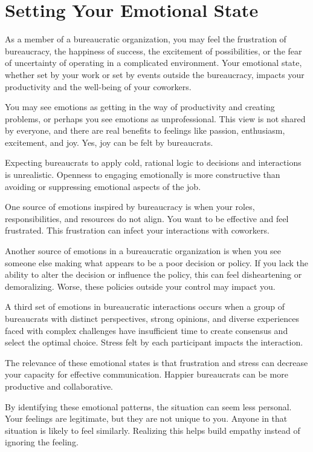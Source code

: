 \section{Setting Your Emotional State}

As a member of a bureaucratic organization, you may feel the frustration of bureaucracy, the happiness of success, the excitement of possibilities, or the fear of uncertainty of operating in a complicated environment. Your emotional state, whether set by your work or set by events outside the bureaucracy, impacts your productivity and the well-being of your coworkers. 

You may see emotions as getting in the way of productivity and creating problems, or perhaps you see emotions as unprofessional. This view is not shared by everyone, and there are real benefits to feelings like passion, enthusiasm, excitement, and joy. Yes, joy can be felt by bureaucrats. 

Expecting bureaucrats to apply cold, rational logic to decisions and interactions is unrealistic. Openness to engaging emotionally is more constructive than avoiding or suppressing emotional aspects of the job. 

One source of emotions inspired by bureaucracy is when your roles, responsibilities, and resources do not align. You want to be effective and feel frustrated. This frustration can infect your interactions with coworkers. 

Another source of emotions in a bureaucratic organization is when you see someone else making what appears to be a poor decision or policy. If you lack the ability to alter the decision or influence the policy, this can feel disheartening or demoralizing. Worse, these policies outside your control may impact you. 

A third set of emotions in bureaucratic interactions occurs when a group of bureaucrats with distinct perspectives, strong opinions, and diverse experiences faced with complex challenges have insufficient time to create consensus and select the optimal choice. Stress felt by each participant impacts the interaction. 

The relevance of these emotional states is that frustration and stress can decrease your capacity for effective communication. Happier bureaucrats can be more productive and collaborative. 

By identifying these emotional patterns, the situation can seem less personal. Your feelings are legitimate, but they are not unique to you. Anyone in that situation is likely to feel similarly. Realizing this helps build empathy instead of ignoring the feeling. 